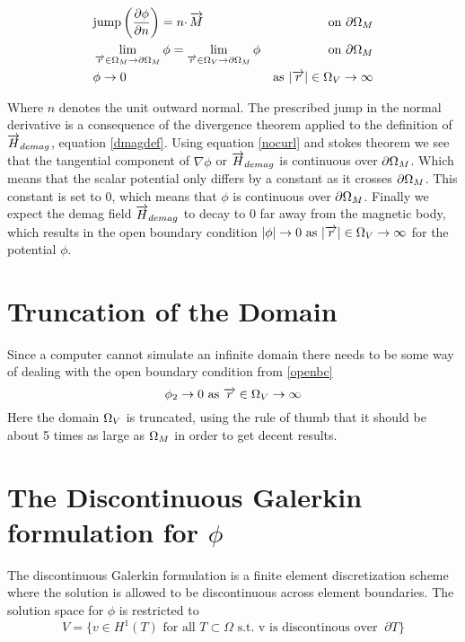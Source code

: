 \documentclass[12pt,a4paper,notitlepage]{article}
\begin{document}
\begin{subequations}
\begin{align}
&\mbox{jump} \left( \frac{\partial \phi}{\partial n} \right) = n \cdotp \overrightarrow{M}  &\mbox{ on }  \partial \Omega_M \label{jumpbc} \\
&\lim_{\overrightarrow{r} \in \Omega_M \rightarrow \partial \Omega_M} \phi =  \lim_{\overrightarrow{r} \in \Omega_V \rightarrow \partial \Omega_M} 
\phi & \mbox{on } \partial \Omega_M \label{contbc} \\
&\phi \rightarrow 0 \ & \mbox{as} \ |\overrightarrow{r}| \in \Omega_V \rightarrow \infty \label{openbc}
\end{align}
\end{subequations}

\noindent Where $n$ denotes the unit outward normal. The prescribed jump in the normal derivative is a 
consequence of the divergence theorem applied to the definition of $\overrightarrow{H}_{demag}$, equation \ref{dmagdef}.
Using equation \ref{nocurl} and stokes theorem we see that the tangential component of $\nabla \phi$ or $\overrightarrow{H}_{demag}$ is
continuous over $\partial \Omega_M$. Which means that the scalar potential only differs by a constant as it crosses $\partial \Omega_M$.
This constant is set to 0, which means that $\phi$ is continuous over $\partial \Omega_M$. Finally we expect the demag field $\overrightarrow{H}_{demag}$ 
to decay to 0 far away from the magnetic body, which results in the open boundary condition
$| \phi | \rightarrow 0  \ \mbox{as} \ |\overrightarrow{r}| \in \Omega_V \rightarrow \infty$ for the potential $\phi$. 


\section{Truncation of the Domain}
Since a computer cannot simulate an infinite domain there needs to be some way of dealing with the open boundary condition from
\ref{openbc}
\[\phi_2 \rightarrow 0 \ \mbox{as} \ \overrightarrow{r} \in \Omega_V \rightarrow \infty \]
Here the domain $\Omega_V$ is truncated, using the rule of thumb that it should be about 5 times as large as $\Omega_M$ in order to get
decent results. 

\section{The Discontinuous Galerkin formulation for $\phi$}
The discontinuous Galerkin formulation is a finite element discretization scheme where the 
solution is allowed to be discontinuous across element boundaries. The solution space for 
$\phi$ is restricted to 
\[ V = \{ v \in H^1 (T) \mbox{ for all } T \subset \Omega \mbox{ s.t. v is discontinous over } 
\ \partial T \} \]
\end{document}
